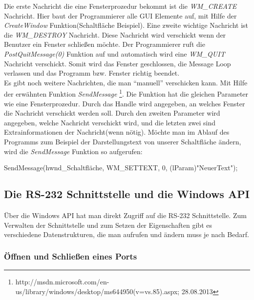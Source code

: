 Die erste Nachricht die eine Fensterprozedur bekommt ist die \textit{WM\_CREATE} Nachricht. Hier baut der Programmierer alle GUI Elemente auf, mit Hilfe der \textit{CreateWindow} Funktion(Schaltfläche Beispiel). Eine zweite wichtige Nachricht ist die \textit{WM\_DESTROY} Nachricht. Diese Nachricht wird verschickt wenn der Benutzer ein Fenster schließen möchte. Der Programmierer ruft die \textit{PostQuitMessage(0)} Funktion auf und automatisch wird eine \textit{WM\_QUIT} Nachricht verschickt. Somit wird das Fenster geschlossen, die Message Loop verlassen und das Programm bzw. Fenster richtig beendet.
\\

Es gibt noch weitere Nachrichten, die man "`manuell"' verschicken kann. Mit Hilfe der erwähnten Funktion \textit{SendMessage} \footnote{http://msdn.microsoft.com/en-us/library/windows/desktop/ms644950(v=vs.85).aspx; 28.08.2013}. Die Funktion hat die gleichen Parameter wie eine Fensterprozedur. Durch das Handle wird angegeben, an welches Fenster die Nachricht verschickt werden soll. Durch den zweiten Parameter wird angegeben, welche Nachricht verschickt wird, und die letzten zwei sind Extrainformationen der Nachricht(wenn nötig). Möchte man im Ablauf des Programms zum Beispiel der Darstellungstext von unserer Schaltfläche ändern, wird die \textit{SendMessage} Funktion so aufgerufen:

\begin{center}
SendMessage(hwnd\_Schaltfläche, WM\_SETTEXT, 0, (lParam)"NeuerText");
\end{center}

\subsection{Die RS-232 Schnittstelle und die Windows API}\label{COMWINAPI}
\paragraph{}
Über die Windows API hat man direkt Zugriff auf die RS-232 Schnittstelle. Zum Verwalten der Schnittstelle und zum Setzen der Eigenschaften gibt es verschiedene Datenstrukturen, die man aufrufen und ändern muss je nach Bedarf.

\subsubsection{Öffnen und Schließen eines Ports}
